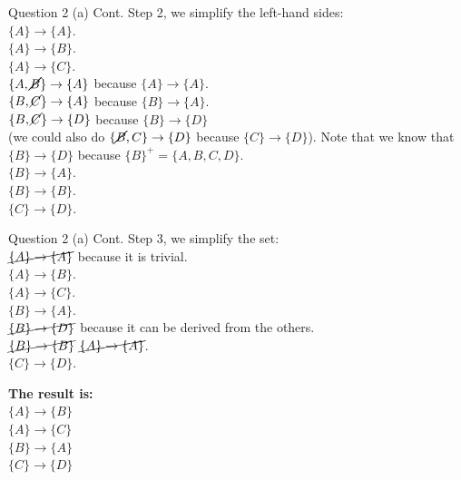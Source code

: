 \begin{frame}[fragile]{Question 2 (a) Cont.}
	Step 2, we simplify the left-hand sides:\\\vspace{3pt}
	$\{A\} \rightarrow \{A\}$.\\	
	$\{A\} \rightarrow \{B\}$.\\	
	$\{A\} \rightarrow \{C\}$.\\	
	$\{A,\cancel{B}\} \rightarrow \{A\}$ because $\{A\} \rightarrow \{A\}$.\\	
	$\{B, \cancel{C}\} \rightarrow \{A\}$ because $\{B\} \rightarrow \{A\}$.\\	
	$\{B, \cancel{C}\} \rightarrow \{D\}$ because $\{B\} \rightarrow \{D\}$ \\\vspace{3pt}
	(we could also do $\{\cancel{B}, C\} \rightarrow \{D\}$ because $\{C\} \rightarrow \{D\}$). Note that we know that $\{B\} \rightarrow \{D\}$ because $\{B\}^{+}= \{A, B, C, D\}$.\\\vspace{3pt}
	$\{B\} \rightarrow \{A\}$.\\
	$\{B\} \rightarrow \{B\}$.\\
	$\{C\} \rightarrow \{D\}$.
\end{frame}

\begin{frame}[fragile]{Question 2 (a) Cont.}
	Step 3, we simplify the set:\\\vspace{3pt}
	$\cancel{\{A\} \rightarrow \{A\}}$ because it is trivial.\\	
	$\{A\} \rightarrow \{B\}$.\\	
	$\{A\} \rightarrow \{C\}$.\\	
	$\{B\} \rightarrow \{A\}$.\\	
	$\cancel{\{B\} \rightarrow \{D\}}$ because it can be derived from the others.\\	
	$\cancel{\{B\} \rightarrow \{B\}}$ $\cancel{\{A\} \rightarrow \{A\}}$.\\	
	$\{C\} \rightarrow \{D\}$.\\\vspace{5pt}
	
	\textbf{The result is:} \\\vspace{3pt}
	$\{A\} \rightarrow \{B\}$\\	
	$\{A\} \rightarrow \{C\}$\\	
	$\{B\} \rightarrow \{A\}$\\
	$\{C\} \rightarrow \{D\}$
\end{frame}

